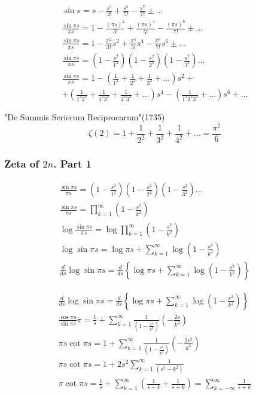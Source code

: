 	$$
	\begin{gathered}
		\sin s=s-\frac{s^3}{3 !}+\frac{s^5}{5 !}-\frac{s^{7}}{7 !} \pm \ldots \\
		\frac{\sin \pi s}{\pi s}=1-\frac{(\pi s)^2}{3 !}+\frac{(\pi s)^4}{5 !}-\frac{(\pi s)^6}{7 !} \pm \ldots \\
		\frac{\sin \pi s}{\pi s}=1-\frac{\pi^2}{3 !} s^2+\frac{\pi^4}{5 !} s^4-\frac{\pi^6}{7 !} s^6 \pm \ldots \\
		\frac{\sin \pi s}{\pi s}=\left(1-\frac{s^2}{1^2}\right)\left(1-\frac{s^2}{2^2}\right)\left(1-\frac{s^2}{3^2}\right) \ldots \\
		\frac{\sin \pi s}{\pi s}=1-\left(\frac{1}{1^2}+\frac{1}{2^2}+\frac{1}{3^2}+\ldots\right) s^2+\\
		+\left(\frac{1}{1^2 2^2}+\frac{1}{1^2 3^2}+\frac{1}{2^2 3^2}+\ldots\right) s^4-
		\left(\frac{1}{1^2 2^2 3^2}+\ldots\right) s^6+\ldots
	\end{gathered}
	$$
	
	"De Summis Serierum Reciprocarum"(1735)
	$$
	\zeta(2)=1+\frac{1}{2^2}+\frac{1}{3^2}+\frac{1}{4^2}+\ldots=\frac{\pi^2}{6}
	$$
	
	\subsubsection{Zeta of $2n$. Part 1}
	
	$$
	\begin{array}{r}
		\frac{\sin \pi s}{\pi s}=\left(1-\frac{s^2}{1^2}\right)\left(1-\frac{s^2}{2^2}\right)\left(1-\frac{s^2}{3^2}\right) \ldots \\
		\frac{\sin \pi s}{\pi s}=\prod_{k=1}^{\infty}\left(1-\frac{s^2}{k^2}\right) \\
		\log \frac{\sin \pi s}{\pi s}=\log \prod_{k=1}^{\infty}\left(1-\frac{s^2}{k^2}\right) \\
		\log \sin \pi s=\log \pi s+\sum_{k=1}^{\infty} \log \left(1-\frac{s^2}{k^2}\right) \\
		\frac{d}{d s} \log \sin \pi s=\frac{d}{d s}\left\{\log \pi s+\sum_{k=1}^{\infty} \log \left(1-\frac{s^2}{k^2}\right)\right\}
	\end{array}
	$$
	
	$$
	\begin{gathered}
		\frac{d}{d s} \log \sin \pi s=\frac{d}{d s}\left\{\log \pi s+\sum_{k=1}^{\infty} \log \left(1-\frac{s^2}{k^2}\right)\right\} \\
		\frac{\cos \pi s}{\sin \pi s} \pi=\frac{1}{s}+\sum_{k=1}^{\infty} \frac{1}{\left(1-\frac{s^2}{k^2}\right)}\left(-\frac{2 s}{k^2}\right) \\
		\pi s \cot \pi s=1+\sum_{k=1}^{\infty} \frac{1}{\left(1-\frac{s^2}{k^2}\right)}\left(-\frac{2 s^2}{k^2}\right) \\
		\pi s \cot \pi s=1+2 s^2 \sum_{k=1}^{\infty} \frac{1}{\left(s^2-k^2\right)} \\
		\pi \cot \pi s=\frac{1}{s}+\sum_{k=1}^{\infty}\left(\frac{1}{s-k}+\frac{1}{s+k}\right)=\sum_{k=-\infty}^{\infty} \frac{1}{s+k}
	\end{gathered}
	$$
	
